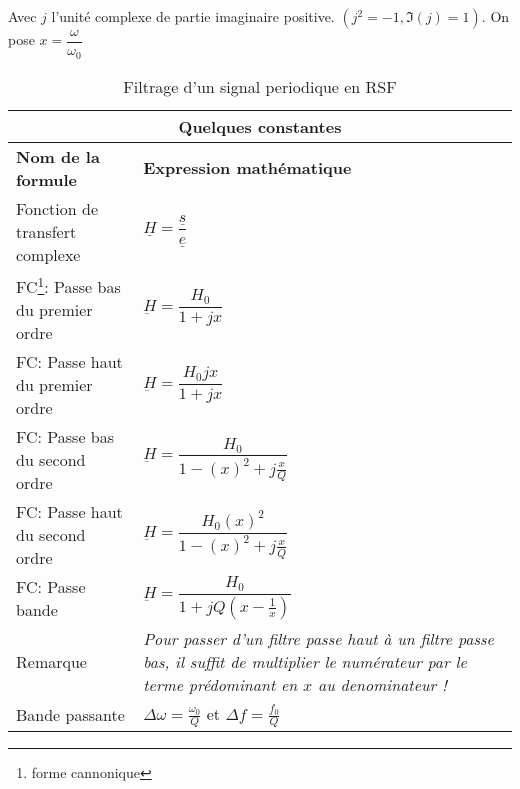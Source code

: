 \documentclass[10pt,a4paper,titlepage,portrait]{article}
\renewcommand{\arraystretch}{2}
\begin{document}
\begin{center}
\begin{table}[ht]
    \centering
    Avec $j$ l'unité complexe de partie imaginaire positive. $\left(j^2 = -1, \Im(j)=1\right)$. On pose $x = \dfrac{\omega}{\omega_0}$
    \renewcommand{\arraystretch}{1.5} %
    \setlength{\tabcolsep}{8pt} %
    \begin{tabular}{@{}p{9cm}p{10cm}@{}}
        \toprule
        \multicolumn{2}{c}{\textbf{Quelques constantes}} \\
        \midrule
        \textbf{Nom de la formule} & \textbf{Expression mathématique} \\
        \midrule
        Fonction de transfert complexe & $\underline{H} = \dfrac{\underline{s}}{\underline{e}}$ \\
        FC\footnote{forme cannonique}: Passe bas du premier ordre & $\underbar{H} = \dfrac{H_0}{1+jx}$ \\
        FC: Passe haut du premier ordre & $\underbar{H} = \dfrac{H_0jx}{1+jx}$ \\ 
        FC: Passe bas du second ordre & $\underbar{H} = \dfrac{H_0}{1-\left(x\right)^2 + j\frac{x}{Q}}$ \\
        FC: Passe haut du second ordre & $\underbar{H} = \dfrac{H_0\left(x\right)^2}{1-\left(x\right)^2 + j\frac{x}{Q}}$ \\
        FC: Passe bande & $\underbar{H} = \dfrac{H_0}{1+jQ\left(x-\frac{1}{x}\right)}$ \\ 
        Remarque & \textit{Pour passer d'un filtre passe haut à un filtre passe bas, il suffit de multiplier le numérateur par le terme prédominant en $x$ au denominateur !} \\ 
        Bande passante & $\Delta\omega = \frac{\omega_0}{Q}$ et $\Delta f=\frac{f_0}{Q}$\\
    \bottomrule
\end{tabular}
\caption{Filtrage d'un signal periodique en RSF}
\label{tab:filtrage}
\end{table}



\end{center}
\end{document}
